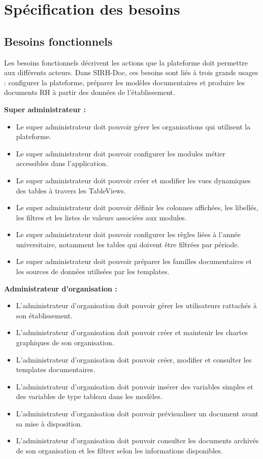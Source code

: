 \section{Spécification des besoins}

\subsection{Besoins fonctionnels}

Les besoins fonctionnels décrivent les actions que la plateforme doit permettre aux différents acteurs. Dans SIRH-Doc, ces besoins sont liés à trois grands usages : configurer la plateforme, préparer les modèles documentaires et produire les documents RH à partir des données de l'établissement.

\textbf{Super administrateur :}
\begin{itemize}
    \item Le super administrateur doit pouvoir gérer les organisations qui utilisent la plateforme.
    \item Le super administrateur doit pouvoir configurer les modules métier accessibles dans l'application.
    \item Le super administrateur doit pouvoir créer et modifier les vues dynamiques des tables à travers les TableViews.
    \item Le super administrateur doit pouvoir définir les colonnes affichées, les libellés, les filtres et les listes de valeurs associées aux modules.
    \item Le super administrateur doit pouvoir configurer les règles liées à l'année universitaire, notamment les tables qui doivent être filtrées par période.
    \item Le super administrateur doit pouvoir préparer les familles documentaires et les sources de données utilisées par les templates.
\end{itemize}

\textbf{Administrateur d'organisation :}
\begin{itemize}
    \item L'administrateur d'organisation doit pouvoir gérer les utilisateurs rattachés à son établissement.
    \item L'administrateur d'organisation doit pouvoir créer et maintenir les chartes graphiques de son organisation.
    \item L'administrateur d'organisation doit pouvoir créer, modifier et consulter les templates documentaires.
    \item L'administrateur d'organisation doit pouvoir insérer des variables simples et des variables de type tableau dans les modèles.
    \item L'administrateur d'organisation doit pouvoir prévisualiser un document avant sa mise à disposition.
    \item L'administrateur d'organisation doit pouvoir consulter les documents archivés de son organisation et les filtrer selon les informations disponibles.
\end{itemize}

